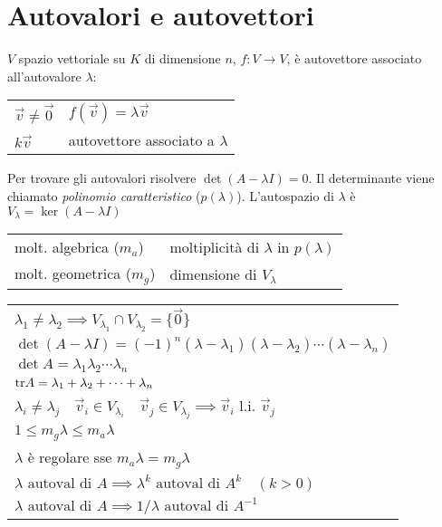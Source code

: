 \section{Autovalori e autovettori}

$V$ spazio vettoriale su $K$ di dimensione $n$, $f: V \rightarrow V$,  è autovettore associato all'autovalore $\lambda$:
\begin{tabular}{ll}
	$\vec{v} \ne \vec{0}$ & $f(\vec{v}) = \lambda \vec{v}$ \\
	$k\vec{v}$ & autovettore associato a $\lambda$
\end{tabular}

Per trovare gli autovalori risolvere $\det(A-\lambda I) = 0$. Il determinante viene chiamato \emph{polinomio caratteristico} ($p(\lambda)$).
L'autospazio di $\lambda$ è $V_\lambda = \ker(A-\lambda I)$

\begin{tabular}{ll}
	molt. algebrica ($m_a$) & moltiplicità di $\lambda$ in $p(\lambda)$ \\
	molt. geometrica ($m_g$) & dimensione di $V_\lambda$
\end{tabular}

\begin{tabular}{l}
	$\lambda_1 \ne \lambda_2 \implies V_{\lambda_1} \cap V_{\lambda_2} = \{\vec{0}\}$ \\
	$\det(A-\lambda I) = (-1)^n (\lambda - \lambda_1) (\lambda - \lambda_2) \cdots (\lambda - \lambda_n)$ \\
	$\det A = \lambda_1 \lambda_2 \cdots \lambda_n$ \\
	$\mathrm{tr} A = \lambda_1 + \lambda_2 + \cdots + \lambda_n$ \\
	$\lambda_i \ne \lambda_j \quad \vec{v}_i \in V_{\lambda_i} \quad \vec{v}_j \in V_{\lambda_j} \implies \vec{v}_i$ l.i. $\vec{v}_j$ \\
	$1 \le m_g \lambda \le m_a \lambda$ \\
	$\lambda$ è regolare sse $m_a \lambda = m_g \lambda$ \\
	$\lambda \text{ autoval di } A \implies \lambda^k \text{ autoval di } A^k \quad (k > 0)$ \\
	$\lambda \text{ autoval di } A \implies 1/\lambda \text{ autoval di } A^{-1}$
\end{tabular}